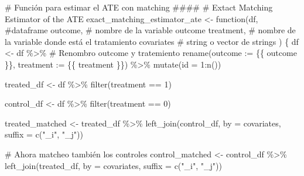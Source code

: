 \documentclass[
  letterpaper,
  DIV=11,
  numbers=noendperiod,
  oneside]{scrreprt}
\newenvironment{Shaded}{\begin{snugshade}}{\end{snugshade}}
\newcommand{\AttributeTok}[1]{\textcolor[rgb]{0.40,0.45,0.13}{#1}}
\newcommand{\CommentTok}[1]{\textcolor[rgb]{0.37,0.37,0.37}{#1}}
\newcommand{\ControlFlowTok}[1]{\textcolor[rgb]{0.00,0.23,0.31}{#1}}
\newcommand{\DecValTok}[1]{\textcolor[rgb]{0.68,0.00,0.00}{#1}}
\newcommand{\FunctionTok}[1]{\textcolor[rgb]{0.28,0.35,0.67}{#1}}
\newcommand{\NormalTok}[1]{\textcolor[rgb]{0.00,0.23,0.31}{#1}}
\newcommand{\OtherTok}[1]{\textcolor[rgb]{0.00,0.23,0.31}{#1}}
\newcommand{\SpecialCharTok}[1]{\textcolor[rgb]{0.37,0.37,0.37}{#1}}
\newcommand{\StringTok}[1]{\textcolor[rgb]{0.13,0.47,0.30}{#1}}
\begin{document}
\begin{Shaded}
\begin{Highlighting}[]
\CommentTok{\# Función para estimar el ATE con matching \#\#\#\#}
\CommentTok{\# Extact Matching Estimator of the ATE}
\NormalTok{exact\_matching\_estimator\_ate }\OtherTok{\textless{}{-}} \ControlFlowTok{function}\NormalTok{(df, }\CommentTok{\#dataframe}
\NormalTok{                                         outcome, }\CommentTok{\# nombre de la variable outcome}
\NormalTok{                                         treatment, }\CommentTok{\# nombre de la variable donde está el tratamiento}
\NormalTok{                                         covariates }\CommentTok{\# string o vector de strings}
\NormalTok{) \{}
\NormalTok{  df }\OtherTok{\textless{}{-}}\NormalTok{ df }\SpecialCharTok{\%\textgreater{}\%}
    \CommentTok{\# Renombro outcome y tratemiento}
    \FunctionTok{rename}\NormalTok{(}\AttributeTok{outcome :=}\NormalTok{ \{\{ outcome \}\},}
           \AttributeTok{treatment :=}\NormalTok{ \{\{ treatment \}\}) }\SpecialCharTok{\%\textgreater{}\%} 
    \FunctionTok{mutate}\NormalTok{(}\AttributeTok{id =} \DecValTok{1}\SpecialCharTok{:}\FunctionTok{n}\NormalTok{())}
  
\NormalTok{  treated\_df }\OtherTok{\textless{}{-}}\NormalTok{ df }\SpecialCharTok{\%\textgreater{}\%} 
    \FunctionTok{filter}\NormalTok{(treatment }\SpecialCharTok{==} \DecValTok{1}\NormalTok{)}
  
\NormalTok{  control\_df }\OtherTok{\textless{}{-}}\NormalTok{ df }\SpecialCharTok{\%\textgreater{}\%} 
    \FunctionTok{filter}\NormalTok{(treatment }\SpecialCharTok{==} \DecValTok{0}\NormalTok{)}
  
\NormalTok{  treated\_matched }\OtherTok{\textless{}{-}}\NormalTok{ treated\_df }\SpecialCharTok{\%\textgreater{}\%} 
    \FunctionTok{left\_join}\NormalTok{(control\_df, }\AttributeTok{by =}\NormalTok{ covariates,}
              \AttributeTok{suffix =} \FunctionTok{c}\NormalTok{(}\StringTok{"\_i"}\NormalTok{, }\StringTok{"\_j"}\NormalTok{))}
  
  \CommentTok{\# Ahora matcheo también los controles}
\NormalTok{  control\_matched }\OtherTok{\textless{}{-}}\NormalTok{ control\_df }\SpecialCharTok{\%\textgreater{}\%} 
    \FunctionTok{left\_join}\NormalTok{(treated\_df, }\AttributeTok{by =}\NormalTok{ covariates,}
              \AttributeTok{suffix =} \FunctionTok{c}\NormalTok{(}\StringTok{"\_i"}\NormalTok{, }\StringTok{"\_j"}\NormalTok{))}
  

\end{Highlighting}
\end{Shaded}
\end{document}
